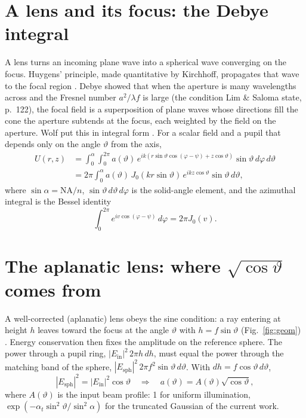 \documentclass[11pt]{article}
\begin{document}
\section{A lens and its focus: the Debye integral}
A lens turns an incoming plane wave into a spherical wave converging on the focus. Huygens' principle, made
quantitative by Kirchhoff, propagates that wave to the focal region \cite{BornWolf, Goodman}. Debye
\cite{Debye} showed that when the aperture is many wavelengths across and the Fresnel number
$a^2/\lambda f$ is large (the condition Lim \& Saloma state, \cite{LS02} p.~122), the focal field is a
superposition of plane waves whose directions fill the cone the aperture subtends at the focus, each weighted
by the field on the aperture. Wolf put this in integral form \cite{Wolf59}. For a scalar field and a pupil
that depends only on the angle $\vartheta$ from the axis,
\[
\begin{aligned}
U(r,z)&=\int_0^{\alpha}\!\!\int_0^{2\pi} a(\vartheta)\,e^{ik(r\sin\vartheta\cos(\varphi-\psi)+z\cos\vartheta)}
\sin\vartheta\,d\varphi\,d\vartheta\\
&=2\pi\!\int_0^{\alpha} a(\vartheta)\,J_0(kr\sin\vartheta)\,e^{ikz\cos\vartheta}\sin\vartheta\,d\vartheta,
\end{aligned}
\]
where $\sin\alpha=\mathrm{NA}/n$, $\sin\vartheta\,d\vartheta\,d\varphi$ is the solid-angle element, and the
azimuthal integral is the Bessel identity
\[\int_0^{2\pi}e^{iv\cos(\varphi-\psi)}\,d\varphi=2\pi J_0(v).\]

\section{\texorpdfstring{The aplanatic lens: where $\sqrt{\cos\vartheta}$ comes from}{The aplanatic lens: where the square root of cos theta comes from}}
A well-corrected (aplanatic) lens obeys the sine condition: a ray entering at height $h$ leaves toward the
focus at the angle $\vartheta$ with $h=f\sin\vartheta$ (Fig.~\ref{fig:geom}) \cite{BornWolf, RichardsWolf}.
Energy conservation then fixes the amplitude on the reference sphere. The power through a pupil ring,
$|E_{\text{in}}|^2\,2\pi h\,dh$, must equal the power through the matching band of the sphere,
$|E_{\text{sph}}|^2\,2\pi f^2\sin\vartheta\,d\vartheta$. With $dh=f\cos\vartheta\,d\vartheta$,
\[
|E_{\text{sph}}|^2=|E_{\text{in}}|^2\cos\vartheta
\quad\Longrightarrow\quad a(\vartheta)=A(\vartheta)\sqrt{\cos\vartheta},
\]
where $A(\vartheta)$ is the input beam profile: 1 for uniform illumination,
$\exp(-\alpha_t\sin^2\vartheta/\sin^2\alpha)$ for the truncated Gaussian of the current work.
\end{document}
